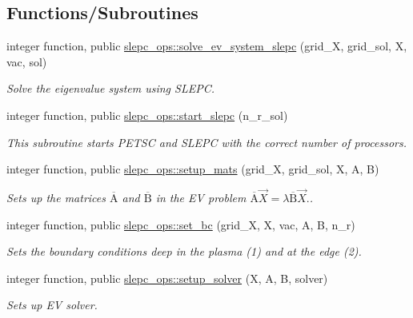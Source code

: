 \subsection*{Functions/\+Subroutines}
\begin{DoxyCompactItemize}
\item 
integer function, public \hyperlink{namespaceslepc__ops_a1e5e6fa1e2d83e20459c46527b6b6de2}{slepc\+\_\+ops\+::solve\+\_\+ev\+\_\+system\+\_\+slepc} (grid\+\_\+X, grid\+\_\+sol, X, vac, sol)
\begin{DoxyCompactList}\small\item\em Solve the eigenvalue system using S\+L\+E\+PC. \end{DoxyCompactList}\item 
integer function, public \hyperlink{namespaceslepc__ops_a0205fe0a0270fad8e45d4b13fae1fb77}{slepc\+\_\+ops\+::start\+\_\+slepc} (n\+\_\+r\+\_\+sol)
\begin{DoxyCompactList}\small\item\em This subroutine starts P\+E\+T\+SC and S\+L\+E\+PC with the correct number of processors. \end{DoxyCompactList}\item 
integer function, public \hyperlink{namespaceslepc__ops_a0f04571702416aff130a18401f4b155e}{slepc\+\_\+ops\+::setup\+\_\+mats} (grid\+\_\+X, grid\+\_\+sol, X, A, B)
\begin{DoxyCompactList}\small\item\em Sets up the matrices $\overline{\text{A}}$ and $\overline{\text{B}}$ in the EV problem $ \overline{\text{A}} \vec{X} = \lambda \overline{\text{B}} \vec{X}. $. \end{DoxyCompactList}\item 
integer function, public \hyperlink{namespaceslepc__ops_a1eee606a244535549075af0ddcbf840b}{slepc\+\_\+ops\+::set\+\_\+bc} (grid\+\_\+X, X, vac, A, B, n\+\_\+r)
\begin{DoxyCompactList}\small\item\em Sets the boundary conditions deep in the plasma (1) and at the edge (2). \end{DoxyCompactList}\item 
integer function, public \hyperlink{namespaceslepc__ops_a04fbebce7deee6403b984de64a6fd426}{slepc\+\_\+ops\+::setup\+\_\+solver} (X, A, B, solver)
\begin{DoxyCompactList}\small\item\em Sets up EV solver. \end{DoxyCompactList}\item 

\end{DoxyCompactItemize}
